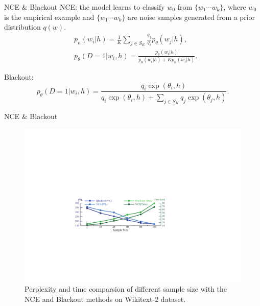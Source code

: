 \documentclass[english]{beamer} %
\begin{document}
\begin{frame}[<+->]{NCE \& Blackout}
NCE: the model learns to classify $w_0$ from $\{w_1\cdots w_k\}$, where $w_0$ is the empirical example and $\{w_1\cdots w_k\}$ are noise samples generated from a prior distribution $q(w)$.
\begin{equation}
\begin{split}
&p_n(w_i|h) = \frac{1}{K} \sum_{j\in S_K} \frac{q_j}{q_i} p_{\theta}(w_j |h),\\
&p_{\theta}(D = 1|w_i, h) = \frac{p_{\theta}(w_i|h)}{p_{\theta}(w_i|h) + Kp_n(w_i|h)}.
\end{split}
\end{equation}

Blackout:
\begin{equation}\label{equ:nce}
p_{\theta}(D = 1|w_i, h) = \frac{q_i \exp(\theta_i, h)}{q_i \exp(\theta_i, h) +\sum_{j\in S_K} q_j \exp(\theta_j, h)}.
\end{equation}
\end{frame}

\begin{frame}[<+->]{NCE \& Blackout}
\begin{figure}[t]
\setlength{\abovecaptionskip}{0pt}
\setlength{\belowcaptionskip}{0pt}
  \centering
  \includegraphics[width=0.85\columnwidth]{nce_blackout}
  \caption{Perplexity and time comparsion of different sample size with the NCE and Blackout methods on Wikitext-2 dataset.}\label{fig:blackout_nce}
\end{figure}
\end{frame}
\end{document}
